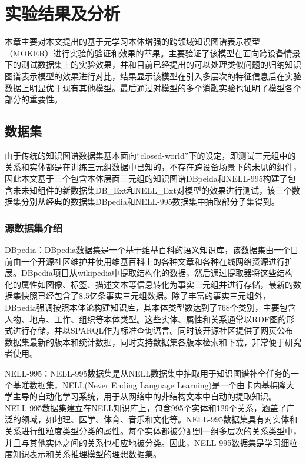 \chapter{实验结果及分析}
本章主要对本文提出的基于元学习本体增强的跨领域知识图谱表示模型（MOKER）进行实验的验证和效果的苹果。主要验证了该模型在面向跨设备情景下的测试数据集上的实验效果，并和目前已经提出的可以处理类似问题的归纳知识图谱表示模型的效果进行对比，结果显示该模型在引入多层次的特征信息后在实验数据上明显优于现有其他模型。最后通过对模型的多个消融实验也证明了模型各个部分的重要性。

\section{数据集}
由于传统的知识图谱数据集基本面向“closed-world”下的设定，即测试三元组中的关系和实体都是在训练三元组数据中已知的，不存在跨设备场景下的未见的组件，因此本文基于三个包含本体层面三元组的知识图谱DBpeida和NELL-995构建了包含未未知组件的新数据集DB\_Ext和NELL\_Ext对模型的效果进行测试，该三个数据集分别从经典的数据集DBpedia和NELL-995数据集中抽取部分子集得到。

\subsection{源数据集介绍}
DBpedia：DBpedia数据集是一个基于维基百科的语义知识库，该数据集由一个目前由一个开源社区维护并使用维基百科上的各种文章和各种在线网络资源进行扩展。DBpedia项目从wikipedia中提取结构化的数据，然后通过提取器将这些结构化的属性如图像、标签、描述文本等信息转化为事实三元组并进行存储，最新的数据集快照已经包含了8.5亿条事实三元组数据。除了丰富的事实三元组外，DBpedia强调按照本体论构建知识库，其本体类型数达到了768个类别，主要包含人物、地点、工作、组织等本体类型。这些实体、属性和关系通常以RDF图的形式进行存储，并以SPARQL作为标准查询语言。同时该开源社区提供了网页公布数据集最新的版本和统计数据，同时支持数据集各版本检索和下载，非常便于研究者使用。

NELL-995：NELL-995数据集是从NELL数据集中抽取用于知识图谱补全任务的一个基准数据集，NELL(Never Ending Language Learning)是一个由卡内基梅隆大学主导的自动化学习系统，用于从网络中的非结构文本中自动的提取知识。NELL-995数据集建立在NELL知识库上，包含995个实体和129个关系，涵盖了广泛的领域，如地理、医学、体育、音乐和文化等。NELL-995数据集具有对实体和关系进行细粒度类型分类的属性。每个实体都被分配到一组多层次的关系类型中，并且与其他实体之间的关系也相应地被分类。因此，NELL-995数据集是学习细粒度知识表示和关系推理模型的理想数据集。

